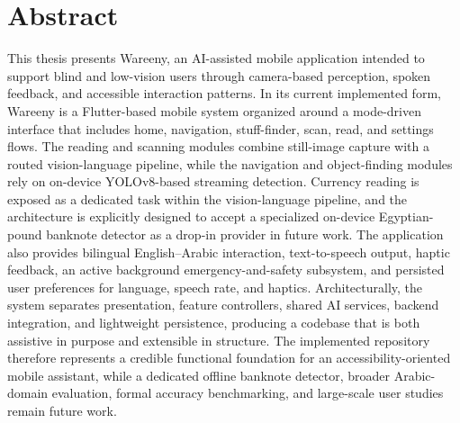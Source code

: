 \documentclass[a4paper]{report}
\begin{document}
\begin{titlepage}
    \vfill

    \noindent{}

\end{titlepage}

\chapter*{Abstract}

This thesis presents Wareeny, an AI-assisted mobile application intended to support blind and low-vision users through camera-based perception, spoken feedback, and accessible interaction patterns. In its current implemented form, Wareeny is a Flutter-based mobile system organized around a mode-driven interface that includes home, navigation, stuff-finder, scan, read, and settings flows. The reading and scanning modules combine still-image capture with a routed vision-language pipeline, while the navigation and object-finding modules rely on on-device YOLOv8-based streaming detection. Currency reading is exposed as a dedicated task within the vision-language pipeline, and the architecture is explicitly designed to accept a specialized on-device Egyptian-pound banknote detector as a drop-in provider in future work. The application also provides bilingual English--Arabic interaction, text-to-speech output, haptic feedback, an active background emergency-and-safety subsystem, and persisted user preferences for language, speech rate, and haptics. Architecturally, the system separates presentation, feature controllers, shared AI services, backend integration, and lightweight persistence, producing a codebase that is both assistive in purpose and extensible in structure. The implemented repository therefore represents a credible functional foundation for an accessibility-oriented mobile assistant, while a dedicated offline banknote detector, broader Arabic-domain evaluation, formal accuracy benchmarking, and large-scale user studies remain future work.
\end{document}
